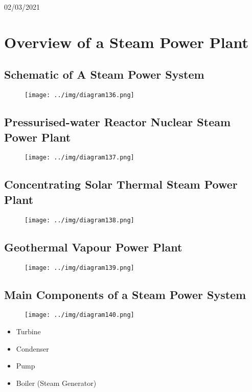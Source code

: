 \documentclass[class=report, crop=false, 12pt,a4paper]{standalone}
\numberwithin{equation}{section}
\begin{document}
\begin{center}
  02/03/2021
\end{center}
\section{Overview of a Steam Power Plant}
\subsection{Schematic of A Steam Power System}
\begin{figure}[H]
  \centering
  \texttt{[image: ../img/diagram136.png]}
  \caption{}
\end{figure}
\subsection{Pressurised-water Reactor Nuclear Steam Power Plant}
\begin{figure}[H]
  \centering
  \texttt{[image: ../img/diagram137.png]}
  \caption{}
\end{figure}
\subsection{Concentrating Solar Thermal Steam Power Plant}
\begin{figure}[H]
  \centering
  \texttt{[image: ../img/diagram138.png]}
  \caption{}
\end{figure}
\subsection{Geothermal Vapour Power Plant}
\begin{figure}[H]
  \centering
  \texttt{[image: ../img/diagram139.png]}
  \caption{}
\end{figure}
\subsection{Main Components of a Steam Power System}
\begin{figure}[H]
  \centering
  \texttt{[image: ../img/diagram140.png]}
  \caption{}
\end{figure}
\begin{itemize}[noitemsep]
  \item Turbine
  \item Condenser
  \item Pump
  \item Boiler (Steam Generator)
\end{itemize}
\end{document}
